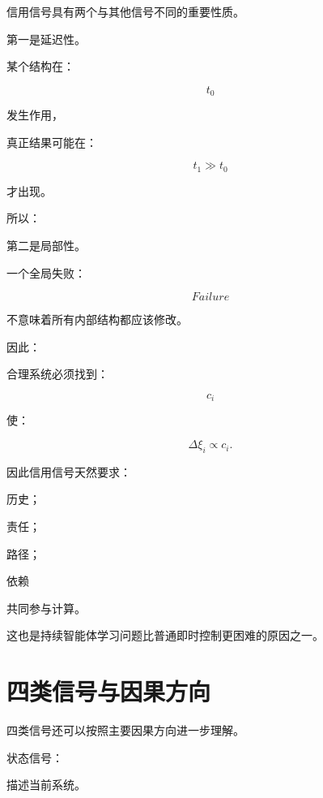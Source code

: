信用信号具有两个与其他信号不同的重要性质。

第一是延迟性。

某个结构在：

\[
t_0
\]

发生作用，

真正结果可能在：

\[
t_1\gg t_0
\]

才出现。

所以：

\begin{statementbox}
\centering
{}
\end{statementbox}

第二是局部性。

一个全局失败：

\[
Failure
\]

不意味着所有内部结构都应该修改。

因此：

\begin{statementbox}
\centering
{}
\end{statementbox}

合理系统必须找到：

\[
c_i
\]

使：

\[
\Delta\xi_i
\propto
c_i.
\]

因此信用信号天然要求：

历史；

责任；

路径；

依赖

共同参与计算。

这也是持续智能体学习问题比普通即时控制更困难的原因之一。

\section{四类信号与因果方向}

四类信号还可以按照主要因果方向进一步理解。

状态信号：

\begin{statementbox}
\centering
{}
\end{statementbox}

描述当前系统。

